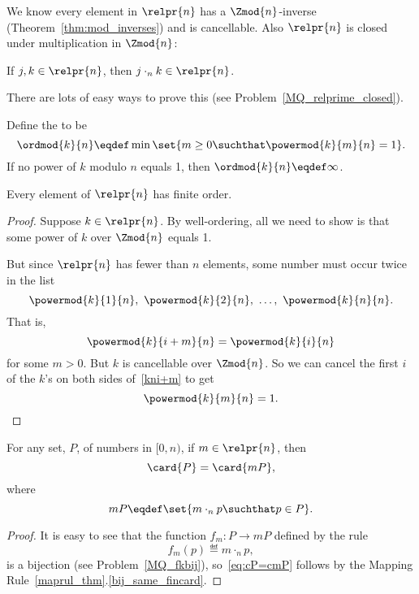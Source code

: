 We know every element in $\relpr{n}$ has a $\Zmod{n}$-inverse
(Theorem~\ref{thm:mod_inverses}) and is cancellable.  Also $\relpr{n}$
is closed under multiplication in $\Zmod{n}$:
\begin{lemma}\label{relprimgroup}
If $j,k \in \relpr{n}$, then $j \cdot_n k \in \relpr{n}$.
\end{lemma}
There are lots of easy ways to prove this (see
Problem~\ref{MQ_relprime_closed}).

\begin{definition}
Define the \index{order over $\Zmod{n}$}{\term{order} of $k \in [0,n)$
    over $\Zmod{n}$} to be
\[
\ordmod{k}{n} \eqdef \min \set{m \geq 0 \suchthat \powermod{k}{m}{n} = 1}.
\]
If no power of $k$ modulo $n$ equals 1, then $\ordmod{k}{n} \eqdef
\infty$.
\end{definition}

\begin{lemma}\label{relprime_order}
Every element of $\relpr{n}$ has finite order.

\begin{proof}
Suppose $k \in \relpr{n}$.  By well-ordering, all we need to show is
that some power of $k$ over $\Zmod{n}$ equals 1.

But since $\relpr{n}$ has fewer than $n$ elements, some number must
occur twice in the list
\[
\powermod{k}{1}{n},\ \powermod{k}{2}{n},\ \dots,\ \powermod{k}{n}{n}.
\] 
That is,
\begin{equation}\label{kni+m}
\powermod{k}{i+m}{n} = \powermod{k}{i}{n}
\end{equation}
for some $m >0$.  But $k$ is cancellable over $\Zmod{n}$.  So we can
cancel the first $i$ of the $k$'s on both sides of~\eqref{kni+m} to
get
\[
\powermod{k}{m}{n} =1.
\]
\end{proof}
\end{lemma}

\begin{lemma}\label{lem:cP=cmP}
For any set, $P$, of numbers in $[0,n)$, if $m \in \relpr{n}$, then
\begin{equation}\label{eq:cP=cmP}
\card{P} = \card{mP},
\end{equation}
where
\[
mP \eqdef \set{m \cdot_n p \suchthat p \in P}.
\]

\begin{proof}
It is easy to see that the function $f_m:P \to mP$ defined by the rule
\[
f_m(p) \eqdef m \cdot_n p,
\]
is a bijection (see Problem~\ref{MQ_fkbij}), so~\eqref{eq:cP=cmP}
follows by the Mapping Rule~\ref{maprul_thm}.\ref{bij_same_fincard}.
\end{proof}

\end{lemma}

